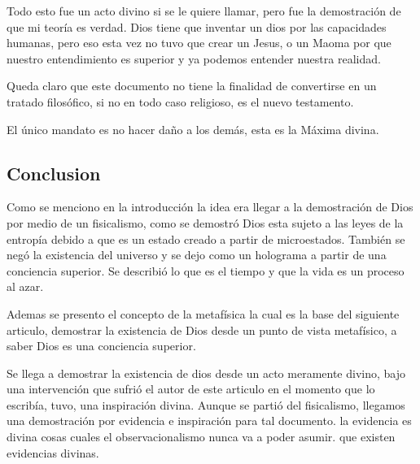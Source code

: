 \documentclass[12pt,letterpaper, a4paper ]{article}
\begin{document}
Todo esto fue un acto divino si se le quiere llamar, pero fue la demostración de que mi teoría es verdad. Dios tiene que inventar un dios por las capacidades humanas, pero eso esta vez no tuvo que crear un Jesus, o un Maoma por que nuestro entendimiento es superior y ya podemos entender nuestra realidad.

Queda claro que este documento no tiene la finalidad de convertirse en un tratado filosófico, si no en todo caso religioso, es el nuevo testamento.

El único mandato es no hacer daño a los demás, esta es la Máxima divina.


\subsection{Conclusion}
Como se menciono en la introducción la idea era llegar a la demostración de Dios por medio de un fisicalismo, como se demostró Dios esta sujeto a las leyes de la entropía debido a que es un estado creado a partir de microestados. También se negó la existencia del universo y se dejo como un holograma a partir de una conciencia superior. Se describió lo que es el tiempo y que la vida es un proceso al azar.

Ademas se presento el concepto de la metafísica la cual es la base del siguiente articulo, demostrar la existencia de Dios desde un punto de vista metafísico, a saber Dios es una conciencia superior.

Se llega a demostrar la existencia de dios desde un acto meramente divino, bajo una intervención que sufrió el autor de este articulo en el momento que lo escribía, tuvo, una inspiración divina.
Aunque se partió del fisicalismo, llegamos una demostración por evidencia e inspiración para tal documento. la evidencia es divina cosas cuales el observacionalismo nunca va a poder asumir. que existen evidencias divinas.
\end{document}
